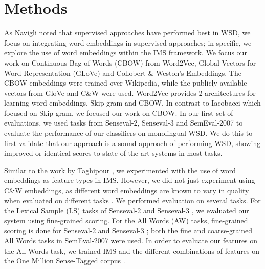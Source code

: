 	\section{Methods}
\label{section:methods}

As Navigli  noted that supervised approaches have performed best in WSD, we focus on integrating word embeddings in supervised approaches; in specific,
we explore the use of word embeddings within the IMS framework. We focus our work on Continuous Bag of Words (CBOW) from Word2Vec,  Global Vectors for Word Representation (GLoVe) and Collobert \& Weston's Embeddings. The CBOW embeddings were trained over Wikipedia, while the publicly available vectors from GloVe and C\&W were used. Word2Vec provides 2 architectures for learning word embeddings, Skip-gram and CBOW. In contrast to Iacobacci  which focused on Skip-gram, we focused our work on CBOW.
In our first set of evaluations, we used tasks from Senseval-2, Senseval-3 and SemEval-2007 to evaluate the performance of our classifiers on monolingual WSD. We do this to first validate that our approach is a sound approach of performing WSD, showing improved or identical scores to state-of-the-art systems in most tasks. 

Similar to the work by Taghipour , we experimented with the use of word embeddings as feature types in IMS. However, we did not just experiment using C\&W embeddings, as different word embeddings are known to vary in quality when evaluated on different tasks \cite{schnabel2015evaluation}. We performed evaluation on several tasks. For the Lexical Sample (LS) tasks of Senseval-2 \cite{senseval2-LS-kilgarriff2001} and Senseval-3 \cite{senseval3-LS-mihalcea2004}, we evaluated our system using fine-grained scoring. For the All Words (AW) tasks, fine-grained scoring is done for Senseval-2 \cite{senseval2-AW-palmer2001} and Senseval-3 \cite{senseval3-AW-snyder2004}; both the fine \cite{semeval2007-fine-pradhan2007} and coarse-grained \cite{semeval2007-coarse-navigli2007} All Words tasks in SemEval-2007 were used. In order to evaluate our features on the All Words task, we trained IMS and the different combinations of features on the One Million Sense-Tagged corpus \cite{taghipour2015one}.


